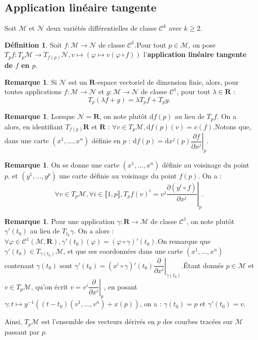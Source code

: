 \documentclass[12pt,a4paper]{article}
\theoremstyle{definition}
\newtheorem{defn}[thm]{Définition}
\newtheorem{rqe}[thm]{Remarque}
\begin{document}
\subsection{Application linéaire tangente}
Soit $\mathcal{M}$ et $\mathcal{N}$ deux variétés différentielles de classe $\mathcal{C}^k$ avec $k\geqslant 2$.
\begin{defn}
Soit $f:\mathcal{M}\to\mathcal{N}$ de classe $\mathcal{C}^1$.\newline Pour tout $p\in\mathcal{M}$, on pose $T_pf:T_p\mathcal{M}\to T_{f(p)}\mathcal{N},v\mapsto \left(\varphi\mapsto v(\varphi\circ f)\right)$ l'\textbf{application linéaire tangente de $f$ en $p$}.
\end{defn}
\begin{rqe}
Si $\mathcal{N}$ est un $\mathbf{R}$-espace vectoriel de dimension finie, alors, pour toutes applications $f:\mathcal{M}\to\mathcal{N}$ et $g:\mathcal{M}\to\mathcal{N}$ de classe $\mathcal{C}^1$, pour tout $\lambda\in\mathbf{R}$ :
$$T_p(\lambda f+g)=\lambda T_pf+T_pg.$$
\end{rqe}
\begin{rqe}
Lorsque $\mathcal{N}=\mathbf{R}$, on note plutôt $\mathrm{d}f(p)$ au lieu de $T_pf$.\newline
On a alors, en identifiant $T_{f(p)}\mathbf{R}$ et $\mathbf{R}$ : $\forall v\in T_p\mathcal{M}, \mathrm{d}f(p)(v)=v(f)$.\newline Notons que, dans une carte $(x^1,\ldots,x^n)$ définie en $p$ : $\mathrm{d}f(p)=\mathrm{d}x^j(p)\left.\dfrac{\partial f}{\partial x^j}\right|_{p}$.
\end{rqe}
\begin{rqe}
On se donne une carte $(x^1,\ldots,x^n)$ définie au voisinage du point $p$. et $(y^1,\ldots,y^p)$ une carte définie au voisinage du point $f(p)$. On a :
$$\forall v\in T_p\mathcal{M},\forall i\in\llbracket 1,p\rrbracket,T_pf(v)^i=v^j\left.\dfrac{\partial (y^i\circ f)}{\partial  x^j}\right|_{p}.$$
\end{rqe}
\begin{rqe}
Pour une application $\gamma:\mathbf{R}\to\mathcal{M}$ de classe $\mathcal{C}^1$, on note plutôt $\gamma'(t_0)$ au lieu de $T_{t_0}\gamma$.\newline
On a alors : $\forall\varphi\in\mathcal{C}^1(\mathcal{M},\mathbf{R}),\gamma'(t_0)(\varphi)=(\varphi\circ \gamma)'(t_0)$.\newline On remarque que $\gamma'(t_0)\in T_{\gamma(t_0)}\mathcal{M}$, et que ses coordonnées dans une carte $(x^1,\ldots,x^n)$ contenant $\gamma(t_0)$ sont $\gamma'(t_0)=(x^i\circ \gamma)'(t_0)\left.\dfrac{\partial}{\partial x^i}\right|_{\gamma(t_0)}$.\newline Étant donnés $p\in \mathcal{M}$ et $v\in T_{p}\mathcal{M}$, qu'on écrit $v=v^i\left.\dfrac{\partial}{\partial x^i}\right|_{p}$, en posant\newline $\gamma:t\mapsto y^{-1}((t-t_0)(v^1,\ldots,v^n)+x(p))$, on a : $\gamma(t_0)=p$ et $\gamma'(t_0)=v$.

Ainsi, $T_p\mathcal{M}$ est l'ensemble des vecteurs dérivés en $p$ des courbes tracées sur $\mathcal{M}$ passant par $p$.
\end{rqe}
\end{document}
